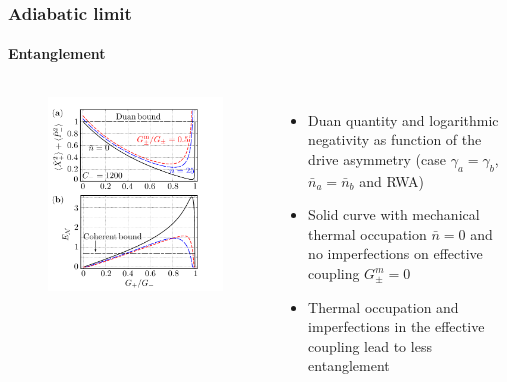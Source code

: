 \documentclass[aspectratio=43]{beamer}
\begin{document}
\begin{frame}
	
	\frametitle{Adiabatic limit}
	\framesubtitle{Entanglement}
	
	\begin{columns}
		
		
		\begin{figure}
			\includegraphics[width = 6 cm]{plots/plot_entanglement.png}
		\end{figure}	
	
		
		\begin{itemize}
			\item Duan quantity and logarithmic negativity as function of the drive asymmetry
			(case $\gamma_{a} = \gamma_{b}$, $\bar{n}_{a} = \bar{n}_{b}$ and RWA)
			\item Solid curve with mechanical thermal occupation $\bar{n} = 0$ and no imperfections on effective coupling $G^{m}_{\pm} = 0$
			\item Thermal occupation and imperfections in the effective coupling lead to less entanglement
		\end{itemize}
		
	\end{columns}

\end{frame}
\end{document}
